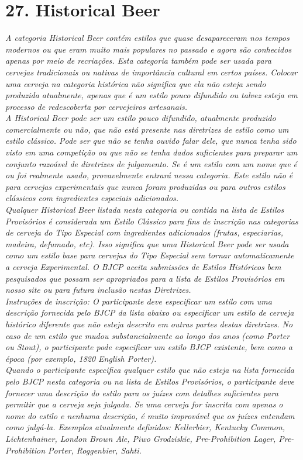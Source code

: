 \section*{27. Historical Beer}
\textit{A categoria Historical Beer contém estilos que quase desapareceram nos tempos modernos ou que eram muito mais populares no passado e agora são conhecidos apenas por meio de recriações. Esta categoria também pode ser usada para cervejas tradicionais ou nativas de importância cultural em certos países. Colocar uma cerveja na categoria histórica não significa que ela não esteja sendo produzida atualmente, apenas que é um estilo pouco difundido ou talvez esteja em processo de redescoberta por cervejeiros artesanais.}\\
\textit{A Historical Beer pode ser um estilo pouco difundido, atualmente produzido comercialmente ou não, que não está presente nas diretrizes de estilo como um estilo clássico. Pode ser que não se tenha ouvido falar dele, que nunca tenha sido visto em uma competição ou que não se tenha dados suficientes para preparar um conjunto razoável de diretrizes de julgamento. Se é um estilo com um nome que é ou foi realmente usado, provavelmente entrará nessa categoria. Este estilo não é para cervejas experimentais que nunca foram produzidas ou para outros estilos clássicos com ingredientes especiais adicionados.}\\
\textit{Qualquer Historical Beer listada nesta categoria ou contida na lista de Estilos Provisórios é considerada um Estilo Clássico para fins de inscrição nas categorias de cerveja do Tipo Especial com ingredientes adicionados (frutas, especiarias, madeira, defumado, etc). Isso significa que uma Historical Beer pode ser usada como um estilo base para cervejas do Tipo Especial sem tornar automaticamente a cerveja Experimental. O BJCP aceita submissões de Estilos Históricos bem pesquisados que possam ser apropriados para a lista de Estilos Provisórios em nosso site ou para futura inclusão nestas Diretrizes.}\\
\textit{Instruções de inscrição: O participante deve especificar um estilo com uma descrição fornecida pelo BJCP da lista abaixo ou especificar um estilo de cerveja histórico diferente que não esteja descrito em outras partes destas diretrizes. No caso de um estilo que mudou substancialmente ao longo dos anos (como Porter ou Stout), o participante pode especificar um estilo BJCP existente, bem como a época (por exemplo, 1820 English Porter).}\\
\textit{Quando o participante especifica qualquer estilo que não esteja na lista fornecida pelo BJCP nesta categoria ou na lista de Estilos Provisórios, o participante deve fornecer uma descrição do estilo para os juízes com detalhes suficientes para permitir que a cerveja seja julgada. Se uma cerveja for inscrita com apenas o nome do estilo e nenhuma descrição, é muito improvável que os juízes entendam como julgá-la. Exemplos atualmente definidos: Kellerbier, Kentucky Common, Lichtenhainer, London Brown Ale, Piwo Grodziskie, Pre-Prohibition Lager, Pre-Prohibition Porter, Roggenbier, Sahti.}
